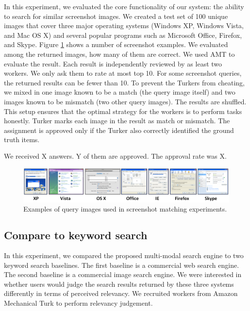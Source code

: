 \documentclass{www2010-submission}
\begin{document}
In this experiment, we evaluated the core functionality of our system:
the ability to search for similar screenshot images.  We created a
test set of 100 unique images that cover three major operating systems
(Windows XP, Windows Vista, and Mac OS X) and several popular programs
such as Microsoft Office, Firefox, and Skype. Figure
\ref{fig:query_examples} shows a number of screenshot examples.  We
evaluated among the returned images, how many of them are correct. We
used AMT to evaluate the result. Each result is independently reviewed
by as least two workers. We only ask them to rate at most top 10. For
some screenshot queries, the returned results can be fewer than 10. To
prevent the Turkers from cheating, we mixed in one image known to be a
match (the query image itself) and two images known to be mismatch
(two other query images). The results are shuffled. This setup ensures
that the optimal strategy for the workers is to perform tasks
honestly. Turker marks each image in the result as match or
mismatch. The assignment is approved only if the Turker also correctly
identified the ground truth items.

We received X answers. Y of them are approved. The approval rate
was X.

\begin{figure}
\includegraphics[width=2\columnwidth]{figure/query_examples.png}
\caption{Examples of query images used in screenshot matching
experiments.}
\label{fig:query_examples}
\end{figure}


\subsection{Compare to keyword search}

In this experiment, we compared the proposed multi-modal search engine
to two keyword search baselines. The first baseline is a commercial
web search engine.  The second baseline is a commercial image search
engine. We were interested in whether users would judge the search
results returned by these three systems differently in terms of
perceived relevancy. We recruited workers from Amazon Mechanical Turk
to perform relevancy judgement.
\end{document}
